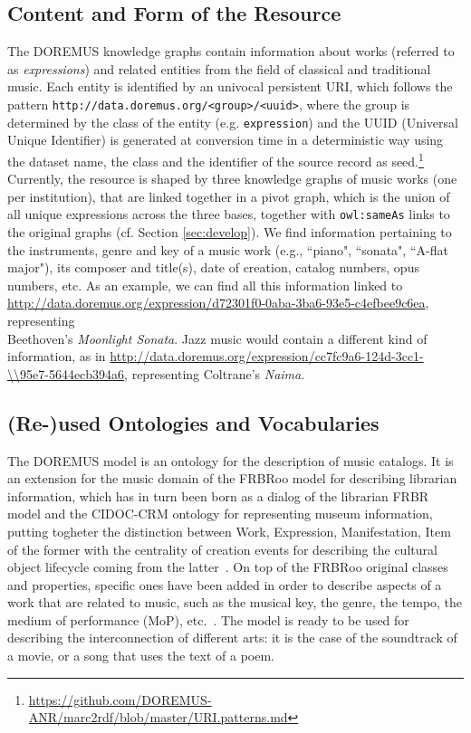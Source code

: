 \subsection{Content and Form of the Resource}
The DOREMUS knowledge graphs contain information about works (referred to as {\it expressions}) and related entities from the field of classical and traditional music. Each entity is identified by an univocal persistent URI, which follows the pattern \texttt{http://data.doremus.org/<group>/<uuid>}, where the group is determined by the class of the entity (e.g. \texttt{expression}) and the UUID (Universal Unique Identifier) is generated at conversion time in a deterministic way using the dataset name, the class and the identifier of the source record as seed.\footnote{\url{https://github.com/DOREMUS-ANR/marc2rdf/blob/master/URI.patterns.md}} Currently, the resource is shaped by three knowledge graphs of music works (one per institution), that are linked together in a pivot graph, which is the union of all unique expressions across the three bases, together with {\tt owl:sameAs} links to the original graphs (cf. Section \ref{sec:develop}). We find information pertaining to the instruments, genre and key of a music work (e.g., ``piano", ``sonata", ``A-flat major"), its composer and title(s), date of creation, catalog numbers, opus numbers, etc. As an example, we can find all this information linked to \url{http://data.doremus.org/expression/d72301f0-0aba-3ba6-93e5-c4efbee9c6ea}, representing \\Beethoven's \textit{Moonlight Sonata}. Jazz music would contain a different kind of information, as in \url{http://data.doremus.org/expression/cc7fc9a6-124d-3cc1-\\95e7-5644ecb394a6}, representing Coltrane's {\it Naima}.%

\subsection{(Re-)used Ontologies and Vocabularies} 
The DOREMUS model is an ontology for the description of music catalogs. It is an extension for the music domain of the FRBRoo model for describing librarian information, which has in turn been born as a dialog of the librarian FRBR model and the CIDOC-CRM ontology for representing museum information, putting togheter the distinction between Work, Expression, Manifestation, Item of the former with the centrality of creation events for describing the cultural object lifecycle coming from the latter~\cite{doerr2008frbroo}. On top of the FRBRoo original classes and properties, specific ones have been added in order to describe aspects of a work that are related to music, such as the musical key, the genre, the tempo, the medium of performance (MoP), etc.~\cite{choffe2016doremus}. The model is ready to be used for describing the interconnection of different arts: it is the case of the soundtrack of a movie, or a song that uses the text of a poem.

